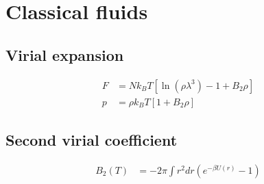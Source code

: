 \section{Classical fluids}

\subsection*{Virial expansion}

\begin{equation*}
    \begin{aligned}
        F &= N k_B T \left[\ln(\rho \lambda^3)-1+B_2\rho\right] \\
        p &= \rho k_B T \left[1 + B_2 \rho\right]
    \end{aligned}
\end{equation*}

\subsection*{Second virial coefficient}

\begin{equation*}
    \begin{aligned}
        B_2(T) &= -2 \pi \int r^2 dr \left(e^{-\beta U(r)} -1\right)
    \end{aligned}
\end{equation*}